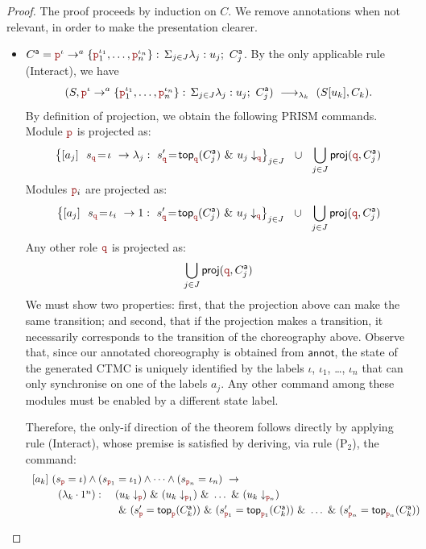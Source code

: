 \begin{proof}
  The proof proceeds by induction on $C$. We remove annotations when
  not relevant, in order to make the presentation clearer.
  \begin{itemize}

  \item
    $\anno
    C=\interactl{\nr^\iota}a{\nr_1^{\iota_1},\ldots,\nr_n^{\iota_n}}$. By
    the only applicable rule \textsf{(Interact)}, we have
    \[
      (S,
      \interactl{\nr^\iota}a{\nr_1^{\iota_1},\ldots,\nr_n^{\iota_n}})
      \red{\lambda_k} (S[u_k], C_k).
    \]
    By definition of projection, we obtain the following PRISM
    commands.  Module \(\nr\) is projected as:
    \[
      \left\{\commandBase {a_j} {\ s_{\nrr}\!=\! \iota} {\lambda_j:}
      \ s_{\nrr}'\!=\! \mathsf{top}_{\nrr}(\anno{C}_j)\ 
      \&\ \projE {u_j}\nrr\right\}_{j\in J}
      \ \ \cup\ \ \bigcup_{j\in J} \proj (\nrr, \anno{C}_j)
    \]
    Modules \(\nr_i\) are projected as:
    \[
      \left\{\commandBase {a_j} {\ s_{\nrr}\!=\! \iota_i} {1:\ s_{\nrr}'\!=\!
      \mathsf{top}_{\nrr}(\anno{C}_j)
      }
      \ \&\ \projE {u_j}\nrr\right\}_{j\in J}
      \ \ \cup\ \ \bigcup_{j\in J} \proj (\role q, \anno{C}_j)
    \]
    Any other role $\nrr$ is projected as:
    \[
      \bigcup_{j\in J} \proj(\nrr, \anno C_j)
    \]
    We must show two properties: first, that the projection above can
    make the same transition; and second, that if the projection makes
    a transition, it necessarily corresponds to the transition of the
    choreography above.
    Observe that, since our annotated choreography is obtained from
    $\mathsf{annot}$, the state of the generated CTMC is uniquely
    identified by the labels $\iota$, $\iota_1$, \dots, $\iota_n$ that
    can only synchronise on one of the labels $a_j$. Any other command
    among these modules must be enabled by a different state label.

    Therefore, the only-if direction of the theorem follows directly
    by applying rule \textsf{(Interact)}, whose premise is satisfied
    by deriving, via rule \textsf{(P$_2$)}, the command:
    \[
      \begin{array}{l}
        \commandBase{a_k}{(s_{\nr}=\iota) \land (s_{\nr_1}=\iota_1)
        \land \dots \land (s_{\nr_n}=\iota_n)}\\[1mm]
        \qquad
        \begin{array}{ll}
          (\lambda_k \cdot 1^n):\ &
                                    (\projE{u_k}{\nr})\ \&\
                                    (\projE{u_k}{\nr_1})\ \&\
                                    \dots\ \&\
                                    (\projE{u_k}{\nr_n})
          \\[1mm]
                                  &\ \&\
                                    (s_{\nr}'=\topannotation{\nr}{\anno C_k})\ \&\
                                    (s_{\nr_1}'=\topannotation{\nr_1}{\anno C_k})\ \&\
                                    \dots\ \&\
                                    (s_{\nr_n}'=\topannotation{\nr_n}{\anno C_k})
        \end{array}
      \end{array}
    \]


\end{itemize}
\end{proof}
